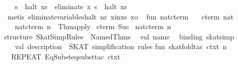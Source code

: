 \begin{isabellebody}
\ \ \ {}{}s{}\ {}\ halt\ xs\ {}\ {}eliminate\ x\ s{}\ {}\ halt\ xs{}\isanewline
%
\isadelimproof
\ \ %
\endisadelimproof
%
\isatagproof
{}\isamarkupfalse%
\ {}metis\ eliminate{}variables{}halt\ nr\ x{}in{}xs\ xo{}%
\endisatagproof
{\isafoldproof}%
%
\isadelimproof
\isanewline
%
\endisadelimproof
%
\isadelimML
\isanewline
%
\endisadelimML
%
\isatagML
{}\isamarkupfalse%
\ {}\isanewline
\isanewline
fun\ nat{}cterm\ {}\ {}\ %
\isaantiq
cterm\ {}{}{}{}nat{}{}%
\endisaantiq
\isanewline
\ \ {}\ nat{}cterm\ n\ {}\ Thm{}apply\ %
\isaantiq
cterm\ Suc{}%
\endisaantiq
\ {}nat{}cterm\ {}n\ {}\ {}{}{}\isanewline
\isanewline
structure\ SkatSimpRules\ {}\ Named{}Thms\isanewline
\ \ {}val\ name\ {}\ %
\isaantiq
binding\ {}skat{}simp{}{}%
\endisaantiq
\isanewline
\ \ \ val\ description\ {}\ {}SKAT\ simplification\ rules{}{}\isanewline
\isanewline
fun\ skat{}fold{}tac\ ctxt\ n\ {}\isanewline
\ \ REPEAT\ {}EqSubst{}eqsubst{}tac\ ctxt\ {}{}{}\ %

\end{isabellebody}
